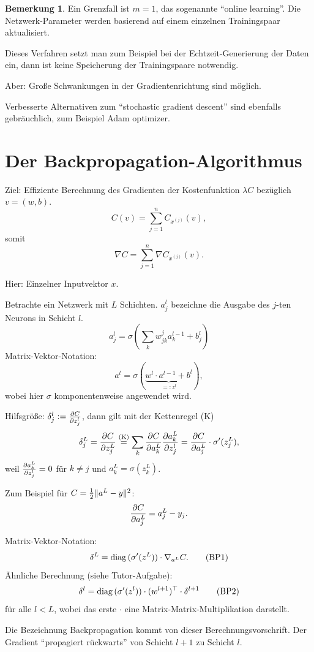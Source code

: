 \documentclass[
 a4paper,
 12pt,
 parskip=half
 ]{scrreprt}
\theoremstyle{plain}
\theoremstyle{definition}
\newtheorem*{rmrk*}{Bemerkung}
\begin{document}
\begin{rmrk*}
  Ein Grenzfall ist $m=1$, das sogenannte ``online learning''. Die
  Netzwerk-Parameter werden basierend auf einem einzelnen Trainingspaar
  aktualisiert.

  Dieses Verfahren setzt man zum Beispiel bei der Echtzeit-Generierung der Daten
  ein, dann ist keine Speicherung der Trainingspaare notwendig.

  Aber: Große Schwankungen in der Gradientenrichtung sind möglich.
\end{rmrk*}

Verbesserte Alternativen zum ``stochastic gradient descent'' sind ebenfalls
gebräuchlich, zum Beispiel Adam optimizer.

\section{Der Backpropagation-Algorithmus}
Ziel: Effiziente Berechnung des Gradienten der Kostenfunktion $\lambda C$
bezüglich $v = (w,b)$.
\[ C(v) = \sum_{j=1}^n C_{x^{(j)}}(v), \]
somit
\[ \nabla C =  \sum_{j=1}^n \nabla C_{x^{(j)}} (v). \]

Hier: Einzelner Inputvektor $x$.

Betrachte ein Netzwerk mit $L$ Schichten. $a_j^l$ bezeichne die Ausgabe des
$j$-ten Neurons in Schicht $l$.
\[ a_j^l = \sigma \left( \sum_k w_{jk}^j a_k^{l-1} + b_j^l \right) \]
Matrix-Vektor-Notation:
\[ a^l = \sigma( \underbrace{w^l \cdot a^{l-1} + b^l}_{=: z^l}), \]
wobei hier $\sigma$ komponentenweise angewendet wird.

Hilfsgröße: $\delta_j^l := \frac{\partial C}{\partial z_j^l}$, dann gilt mit der Kettenregel (K)
\[ \delta_j^L = \frac{\partial C}{\partial z_j^L} \overset{\text{(K)}}{=}
  \sum_k \frac{\partial C}{\partial a_k^L} \frac{\partial a_k^L}{\partial z_j^l} =
  \frac{\partial C}{\partial a_j^L} \cdot \sigma'(z_j^L), \]
weil $\frac{\partial a_k^L}{\partial z_j^l} = 0 $ für $k \ne j$ und $a_k^L = \sigma(z_k^L)$.

Zum Beispiel für $C = \frac{1}{2} \| a^L - y \|^2 $:
\[ \frac{\partial C}{\partial a_j^L} = a_j^L - y_j. \]

Matrix-Vektor-Notation:
\[ \delta^L = \mathrm{diag}\,( \sigma'(z^L)) \cdot \nabla_{a^L} C. \tag{BP1} \]
Ähnliche Berechnung (siehe Tutor-Aufgabe):
\[ \delta^l = \mathrm{diag}\,( \sigma'(z^l)) \cdot (w^{l+1})^\top \cdot \delta^{l+1}
  \tag{BP2} \]
für alle $l < L$, wobei das erste $\cdot$ eine Matrix-Matrix-Multiplikation
darstellt.

Die Bezeichnung Backpropagation kommt von dieser Berechnungsvorschrift. Der
Gradient ``propagiert rückwarts'' von Schicht $l+1$ zu Schicht $l$.
\end{document}
